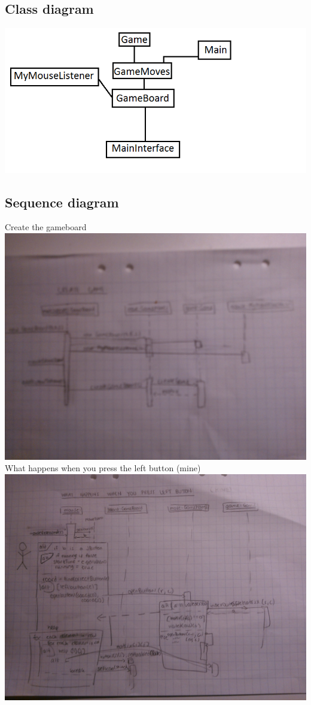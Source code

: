 \documentclass[12pt,twoside,a4paper]{article}
\begin{document}
\subsection{Class diagram}
\includegraphics{classdiagram.png}


\subsection{Sequence diagram}
Create the gameboard \\
\includegraphics[scale = 0.2]{seqdiag1.jpg} \\
What happens when you press the left button (mine) \\
\includegraphics[scale = 0.2]{seqdiag.jpg}
\end{document}
